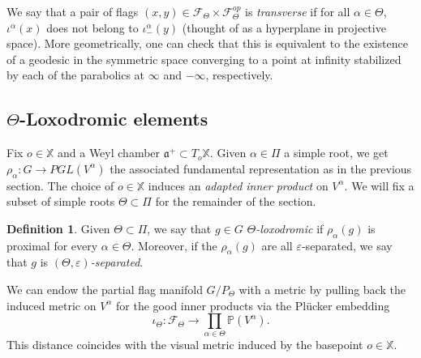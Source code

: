 \documentclass{amsart}
\theoremstyle{remark}
\theoremstyle{definition}
\newtheorem{defi}[thm]{Definition}
\begin{document}
We say that a pair of flags $(x, y) \in \mathcal{F}_\Theta \times \mathcal{F}_\Theta^{op}$ is \emph{transverse} if for all $\alpha \in \Theta$, $\iota^\alpha(x)$ does not belong to $\iota_-^\alpha(y)$ (thought of as a hyperplane in projective space).
More geometrically, one can check that this is equivalent to the existence of a geodesic in the symmetric space converging to a point at infinity stabilized by each of the parabolics at $\infty$ and $-\infty$, respectively.

\subsection{$\Theta$-Loxodromic elements}

Fix $o \in \mathbb{X}$ and a Weyl chamber $\mathfrak{a}^+ \subset T_o \mathbb{X}$.
Given $\alpha \in \Pi$ a simple root, we get $\rho_\alpha : G \to PGL (V^\alpha)$ the associated fundamental representation as in the previous section.
The choice of $o \in \mathbb{X}$ induces an \emph{adapted inner product} on $V^\alpha$.
We will fix a subset of simple roots $\Theta \subset \Pi$ for the remainder of the section.

\begin{defi}
\label{defi:separatedloxodromic}
 Given $\Theta \subset \Pi$, we say that $g \in G$ \emph{$\Theta$-loxodromic} if $\rho_\alpha (g)$ is proximal for every $\alpha \in \Theta$. 
 Moreover, if the $\rho_\alpha(g)$ are all $\varepsilon$-separated, we say that $g$ is \emph{$(\Theta,\varepsilon)$-separated}.
\end{defi}

We can endow the partial flag manifold $G/P_\Theta$ with a metric by pulling back the induced metric on $V^\alpha$ for the good inner products via the Plücker embedding $$\iota_\Theta: \mathcal{F}_\Theta \to \prod_{\alpha \in \Theta} \mathbb{P} (V^\alpha).$$
This distance coincides with the visual metric induced by the basepoint $o \in \mathbb{X}$.
\end{document}
